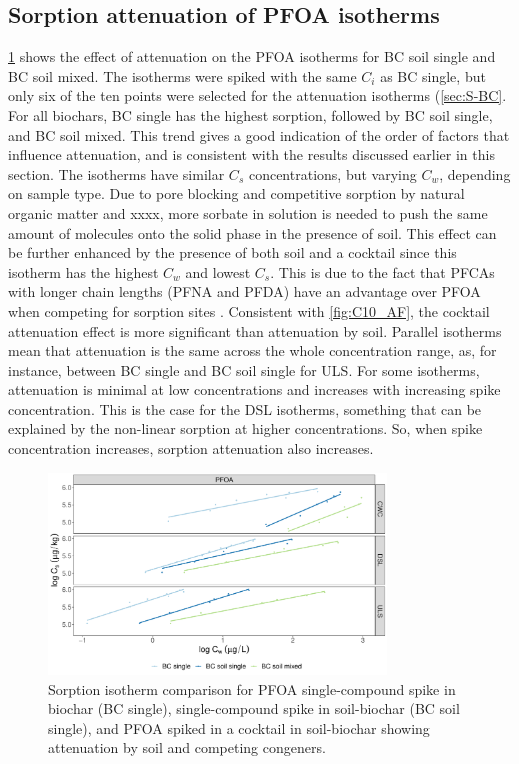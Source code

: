 \subsection{Sorption attenuation of PFOA isotherms}
\cref{fig:PFOA_attenuation} shows the effect of attenuation on the PFOA isotherms for BC soil single and BC soil mixed. The isotherms were spiked with the same $C_i$ as BC single, but only six of the ten points were selected for the attenuation isotherms (\cref{sec:S-BC}. For all biochars, BC single has the highest sorption, followed by BC soil single, and BC soil mixed. This trend gives a good indication of the order of factors that influence attenuation, and is consistent with the results discussed earlier in this section. The isotherms have similar $C_s$ concentrations, but varying $C_w$, depending on sample type. Due to pore blocking and competitive sorption by natural organic matter and xxxx, more sorbate in solution is needed to push the same amount of molecules onto the solid phase in the presence of soil. This effect can be further enhanced by the presence of both soil and a cocktail since this isotherm has the highest $C_w$ and lowest $C_s$. This is due to the fact that PFCAs with longer chain lengths (PFNA and PFDA) have an advantage over PFOA when competing for sorption sites \citep{Sormo2021}. Consistent with \cref{fig:C10_AF}, the cocktail attenuation effect is more significant than attenuation by soil. Parallel isotherms mean that attenuation is the same across the whole concentration range, as, for instance, between BC single and BC soil single for ULS. For some isotherms, attenuation is minimal at low concentrations and increases with increasing spike concentration. This is the case for the DSL isotherms, something that can be explained by the non-linear sorption at higher concentrations. So, when spike concentration increases, sorption attenuation also increases. 

\begin{figure}[htb]
    \centering
    \includegraphics[width=0.8\textwidth]{R/figs/Attenuation_isotherms_PFOA.pdf}
    \caption{Sorption isotherm comparison for PFOA single-compound spike in biochar (BC single), single-compound spike in soil-biochar (BC soil single), and PFOA spiked in a cocktail in soil-biochar showing attenuation by soil and competing congeners.}
    \label{fig:PFOA_attenuation}
\end{figure}

